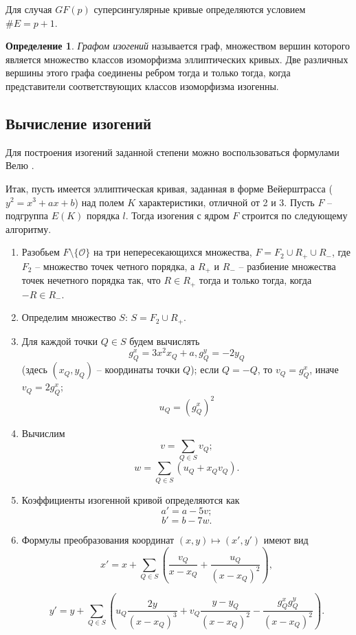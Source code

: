 \documentclass[a4paper,12pt]{article}
\theoremstyle{definition}
\newtheorem{definition}{Определение}
\newtheorem{example}{Пример}
\begin{document}
Для случая $GF(p)$ суперсингулярные кривые определяются условием $\#E=p+1$. %



\begin{definition}
\emph{Графом изогений} называется граф, множеством вершин которого является множество классов изоморфизма эллиптических кривых. 
Две различных вершины этого графа соединены ребром тогда и только тогда, когда представители соответствующих классов изоморфизма изогенны.
\end{definition}

\subsection{Вычисление изогений}

Для построения изогений заданной степени можно воспользоваться формулами Велю \cite{Velu}. 

Итак, пусть имеется эллиптическая кривая, заданная в форме Вейерштрасса ($y^2=x^3+ax+b$) над полем $K$ характеристики, отличной от 2 и 3. Пусть $F$ -- подгруппа $E(K)$ порядка $l$. Тогда изогения с ядром $F$ строится по следующему алгоритму.

\begin{enumerate}
 \item Разобьем $F\setminus\{\mathcal{O}\}$ на три непересекающихся множества, $F=F_2\cup R_+\cup R_-$, где $F_2$ -- множество точек четного порядка,
 а $R_+$ и $R_-$ -- разбиение множества точек нечетного порядка так, что $R\in R_+$ тогда и только тогда, когда $-R\in R_-$.
 \item Определим множество $S$: $S=F_2\cup R_+$.
 \item Для каждой точки $Q\in S$ будем вычислять
 $$
 g_Q^x=3x^2x_Q+a, g_Q^y=-2y_Q
 $$
 (здесь $(x_Q,y_Q)$ -- координаты точки $Q$); 
 если $Q=-Q$, то $v_Q=g_Q^x$, иначе $v_Q=2g_Q^x$;
 $$
 u_Q=(g_Q^x)^2
  $$
  \item Вычислим
  $$
  v=\sum_{Q\in S} v_Q;
  $$
  $$
  w=\sum_{Q\in S} (u_Q+x_Qv_Q).
  $$
\item  Коэффициенты изогенной кривой определяются как 
$$
a'=a-5v;
$$
$$
b'=b-7w.
$$
\item Формулы преобразования координат $(x,y)\mapsto (x',y')$ имеют вид
$$
x'=x+\sum_{Q\in S} \left(\frac{v_Q}{x-x_Q}+\frac{u_Q}{(x-x_Q)^2}\right),
$$

$$
y'=y+\sum_{Q\in S} \left(u_Q\frac{2y}{(x-x_Q)^3}+v_Q\frac{y-y_Q}{(x-x_Q)^2}-\frac{g_Q^xg_Q^y}{(x-x_Q)^2}\right).
$$
  \end{enumerate}
\end{document}
